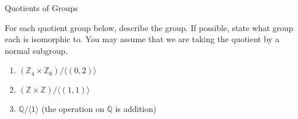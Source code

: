 \begin{section}{Quotients of Groups}
\begin{problem}
For each quotient group below, describe the group.  If possible, state what group each is isomorphic to.  You may assume that we are taking the quotient by a normal subgroup. 
\begin{enumerate}[label=\textrm{(\alph*)}]
\item $(\mathbb{Z}_4\times \mathbb{Z}_6)/\langle (0,2)\rangle$
\item $(\mathbb{Z}\times \mathbb{Z})/\langle (1,1)\rangle$
\item $\mathbb{Q}/\langle 1\rangle$ (the operation on $\mathbb{Q}$ is addition)
\end{enumerate}
\end{problem}

\end{section}